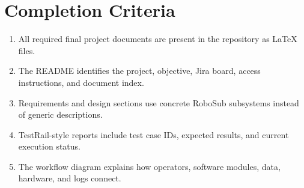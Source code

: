 \documentclass[12pt]{article}
\begin{document}
\section{Completion Criteria}
\begin{enumerate}[leftmargin=*]
  \item All required final project documents are present in the repository as LaTeX files.
  \item The README identifies the project, objective, Jira board, access instructions, and document index.
  \item Requirements and design sections use concrete RoboSub subsystems instead of generic descriptions.
  \item TestRail-style reports include test case IDs, expected results, and current execution status.
  \item The workflow diagram explains how operators, software modules, data, hardware, and logs connect.
\end{enumerate}
\end{document}

